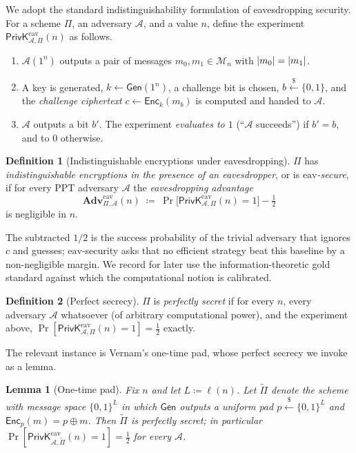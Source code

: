 \documentclass[11pt]{article}
\theoremstyle{plain}
\newtheorem{lemma}{Lemma}
\theoremstyle{definition}
\newtheorem{definition}{Definition}
\newcommand{\bit}{\{0,1\}}
\newcommand{\secp}{n}                       %
\newcommand{\adv}{\mathcal{A}}
\newcommand{\Enc}{\mathsf{Enc}}
\newcommand{\Gen}{\mathsf{Gen}}
\newcommand{\PPT}{\mathrm{PPT}}
\DeclarePairedDelimiter{\abs}{\lvert}{\rvert}
\newcommand{\getsr}{\overset{\$}{\leftarrow}}   %
\newcommand{\Adv}{\mathbf{Adv}}
\newcommand{\PrivK}{\mathsf{PrivK}}
\newcommand{\eav}{\mathrm{eav}}
\newcommand{\Pron}{\Pi}
\newcommand{\Ptilde}{\widetilde{\Pi}}
\begin{document}
We adopt the standard indistinguishability formulation of eavesdropping
security. For a scheme $\Pron$, an adversary $\adv$, and a value $\secp$, define
the experiment $\PrivK^{\eav}_{\adv,\Pron}(\secp)$ as follows.

\begin{enumerate}
  \item $\adv(1^\secp)$ outputs a pair of messages
        $m_0, m_1 \in \mathcal{M}_\secp$ with $\abs{m_0} = \abs{m_1}$.
  \item A key is generated, $k \leftarrow \Gen(1^\secp)$, a challenge bit is
        chosen, $b \getsr \bit$, and the \emph{challenge ciphertext}
        $c \leftarrow \Enc_k(m_b)$ is computed and handed to $\adv$.
  \item $\adv$ outputs a bit $b'$. The experiment \emph{evaluates to $1$}
        (``$\adv$ succeeds'') if $b' = b$, and to $0$ otherwise.
\end{enumerate}

\begin{definition}[Indistinguishable encryptions under eavesdropping]
\label{def:eav}
$\Pron$ has \emph{indistinguishable encryptions in the presence of an
eavesdropper}, or is \emph{$\eav$-secure}, if for every $\PPT$ adversary $\adv$
the \emph{eavesdropping advantage}
\[
  \Adv^{\eav}_{\Pron,\adv}(\secp)
  \;\coloneqq\;
  \Pr\!\bigl[\PrivK^{\eav}_{\adv,\Pron}(\secp) = 1\bigr] - \tfrac{1}{2}
\]
is negligible in $\secp$.
\end{definition}

The subtracted $1/2$ is the success probability of the trivial adversary that
ignores $c$ and guesses; $\eav$-security asks that no efficient strategy beat
this baseline by a non-negligible margin. We record for later use the
information-theoretic gold standard against which the computational notion is
calibrated.

\begin{definition}[Perfect secrecy]\label{def:perfect}
$\Pron$ is \emph{perfectly secret} if for every $\secp$, every adversary $\adv$
whatsoever (of arbitrary computational power), and the experiment above,
$\Pr[\PrivK^{\eav}_{\adv,\Pron}(\secp)=1] = \tfrac12$ exactly.
\end{definition}

The relevant instance is Vernam's one-time pad, whose perfect secrecy we invoke
as a lemma.

\begin{lemma}[One-time pad]\label{lem:otp}
Fix $\secp$ and let $L \coloneqq \ell(\secp)$. Let $\Ptilde$ denote the scheme
with message space $\bit^{L}$ in which $\Gen$ outputs a uniform pad
$p \getsr \bit^{L}$ and $\Enc_p(m) = p \oplus m$. Then $\Ptilde$ is perfectly
secret; in particular
$\Pr[\PrivK^{\eav}_{\adv,\Ptilde}(\secp) = 1] = \tfrac{1}{2}$ for every $\adv$.
\end{lemma}
\end{document}
